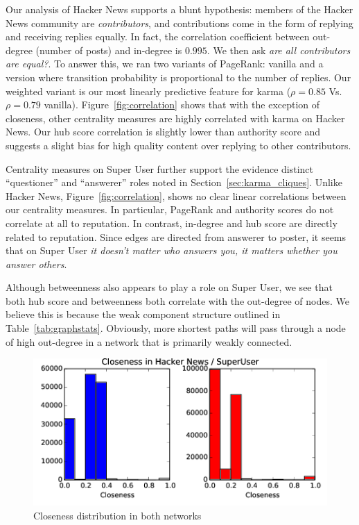 \documentclass[11pt]{article}
\begin{document}
Our analysis of Hacker News supports a blunt hypothesis: members of the Hacker
News community are \textit{contributors}, and contributions come in the form of
replying and receiving replies equally. In fact, the correlation coefficient
between out-degree (number of posts) and in-degree is $0.995$. We then ask
\textit{are all contributors are equal?}. To answer this, we ran two variants of
PageRank: vanilla and a version where transition probability is proportional to
the number of replies. Our weighted variant is our most linearly predictive
feature for karma ($\rho = 0.85$ Vs. $\rho=0.79$ vanilla).
Figure~\ref{fig:correlation} shows that with the exception of closeness, other
centrality measures are highly correlated with karma on Hacker News.  
Our hub score correlation is slightly lower than authority score and suggests 
a slight bias for high quality content over replying to other contributors.

Centrality measures on Super User further support the evidence distinct
``questioner'' and ``answerer'' roles noted in Section~\ref{sec:karma_cliques}.
Unlike Hacker News, Figure~\ref{fig:correlation}, shows no clear linear
correlations between our centrality measures. In particular, PageRank and
authority scores do not correlate at all to reputation. In contrast,  in-degree 
and hub score are directly related to reputation. Since edges are directed from answerer
to poster, it seems that on Super User
\textit{it doesn't matter who answers you, it matters whether you answer others}.

Although betweenness also appears to play a role on Super User, we see that
both hub score and betweenness both correlate with the out-degree of nodes.
We believe this is because the weak component structure outlined in 
Table~\ref{tab:graphstats}. Obviously, more shortest paths will pass through a
node of high out-degree in a network that is primarily weakly connected.

\begin{figure}[h]
\centering
\includegraphics[width=\linewidth]{closeness-png}
\caption{Closeness distribution in both networks}
\label{fig:closeness}

\end{figure}
\end{document}
